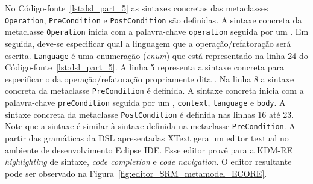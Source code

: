 No Código-fonte~\ref{lst:dsl_part_5} as sintaxes concretas das metaclasses \texttt{Operation}, \texttt{PreCondition} e \texttt{PostCondition} são definidas. A sintaxe concreta da metaclasse \texttt{Operation} inicia com a palavra-chave \texttt{operation} seguida por um \aspas{\{}. Em seguida, deve-se especificar qual a linguagem que a operação/refatoração será escrita. \texttt{Language} é uma enumeração (\textit{enum}) que está representado na linha 24 do Código-fonte~\ref{lst:dsl_part_5}. A linha 5 representa a sintaxe concreta para especificar o  da operação/refatoração propriamente dita . Na linha 8 a sintaxe concreta da metaclasse \texttt{PreCondition} é definida. A sintaxe concreta inicia com a palavra-chave \texttt{preCondition} seguida por um \aspas{\{}, \texttt{context}, \texttt{language} e \texttt{body}. A sintaxe concreta da metaclasse \texttt{PostCondition} é definida nas linhas 16 até 23. Note que a sintaxe é similar à sintaxe definida na metaclasse \texttt{PreCondition}. A partir das gramáticas da DSL apresentadas XText gera um editor textual no ambiente de desenvolvimento Eclipse IDE. Esse editor provê para a KDM-RE \textit{highlighting} de sintaxe, \textit{code completion} e \textit{code navigation}. O editor resultante pode ser observado na Figura~\ref{fig:editor_SRM_metamodel_ECORE}.




